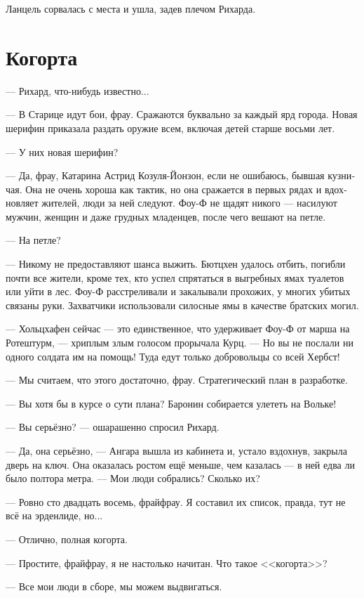 \documentclass[a4paper,12pt,fleqn]{book}\usepackage{polyglossia}\setdefaultlanguage[babelshorthands=true]{russian}\setotherlanguage{english}\defaultfontfeatures{Ligatures=TeX,Mapping=tex-text}\usepackage{xcolor}\newcommand{\ml}[3]{#2}
\begin{document}
Ланцель сорвалась с места и ушла, задев плечом Рихарда.

\section{Когорта}

--- Рихард, что-нибудь известно...

--- В Старице идут бои, фрау.
Сражаются буквально за каждый ярд города.
Новая шерифин приказала раздать оружие всем, включая детей старше восьми лет.

--- У них новая шерифин?

--- Да, фрау, Катарина Астрид Козуля-Йонзон, если не ошибаюсь, бывшая кузничая.
Она не очень хороша как тактик, но она сражается в первых рядах и вдохновляет жителей, люди за ней следуют.
Фоу-Ф не щадят никого --- насилуют мужчин, женщин и даже грудных младенцев, после чего вешают на петле.

--- На петле?

--- Никому не предоставляют шанса выжить.
Бютцхен удалось отбить, погибли почти все жители, кроме тех, кто успел спрятаться в выгребных ямах туалетов или уйти в лес. %
Фоу-Ф расстреливали и закалывали прохожих, у многих убитых связаны руки.
Захватчики использовали силосные ямы в качестве братских могил.

--- Хольцхафен сейчас --- это единственное, что удерживает Фоу-Ф от марша на Ротештурм, --- хриплым злым голосом прорычала Курц.
--- Но вы не послали ни одного солдата им на помощь!
Туда едут только добровольцы со всей Хербст!

--- Мы считаем, что этого достаточно, фрау.
Стратегический план в разработке.

--- Вы хотя бы в курсе о сути плана?
Баронин собирается улететь на Вольке!

--- Вы серьёзно? --- ошарашенно спросил Рихард.

--- Да, она серьёзно, --- Ангара вышла из кабинета и, устало вздохнув, закрыла дверь на ключ.
Она оказалась ростом ещё меньше, чем казалась --- в ней едва ли было полтора метра.
--- Мои люди собрались?
Сколько их?

--- Ровно сто двадцать восемь, фрайфрау.
Я составил их список, правда, тут не всё на эрденлиде, но...

--- Отлично, полная когорта.

--- Простите, фрайфрау, я не настолько начитан.
Что такое <<когорта>>?

--- Все мои люди в сборе, мы можем выдвигаться.
\end{document}
